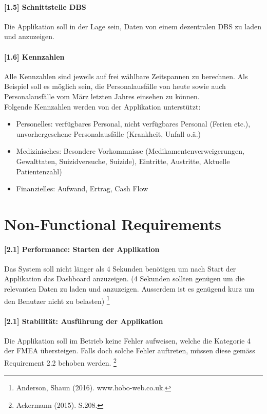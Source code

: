 \documentclass[a4paper]{scrreprt}
\begin{document}
\paragraph{[1.5] Schnittstelle DBS}
Die Applikation soll in der Lage sein, Daten von einem dezentralen DBS zu laden und anzuzeigen. 

\paragraph{[1.6] Kennzahlen}
Alle Kennzahlen sind jeweils auf frei wählbare Zeitspannen zu berechnen. Als Beispiel soll es möglich sein, die Personalausfälle von heute sowie auch Personalausfälle vom März letzten Jahres einsehen zu können. \\
Folgende Kennzahlen werden von der Applikation unterstützt:
\begin{itemize}
\item Personelles: verfügbares Personal, nicht verfügbares Personal (Ferien etc.), unvorhergesehene Personalausfälle (Krankheit, Unfall o.ä.)
\item Medizinisches: Besondere Vorkommnisse (Medikamentenverweigerungen, Gewalttaten, Suizidversuche, Suizide), Eintritte, Austritte, Aktuelle Patientenzahl)
\item Finanzielles: Aufwand, Ertrag, Cash Flow
\end{itemize}

\section{Non-Functional Requirements}
\paragraph{[2.1] Performance: Starten der Applikation}
Das System soll nicht länger als 4 Sekunden benötigen um nach Start der Applikation das Dashboard anzuzeigen. (4 Sekunden sollten genügen um die relevanten Daten zu laden und anzuzeigen. Ausserdem ist es genügend kurz um den Benutzer nicht zu belasten)
\footnote{Anderson, Shaun (2016). www.hobo-web.co.uk.}

\paragraph{[2.1] Stabilität: Ausführung der Applikation}
Die Applikation soll im Betrieb keine Fehler aufweisen, welche die Kategorie 4 der FMEA übersteigen. Falls doch solche Fehler auftreten, müssen diese gemäss Requirement 2.2 behoben werden. 
\footnote{Ackermann (2015). S.208.}
\end{document}
